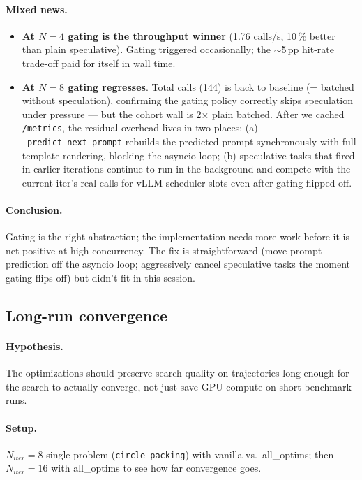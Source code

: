 \documentclass[11pt]{article}
\begin{document}
\paragraph{Mixed news.}
\begin{itemize}
  \item \textbf{At $N{=}4$ gating is the throughput winner} (1.76
    calls/s, 10\,\% better than plain speculative). Gating triggered
    occasionally; the $\sim$5\,pp hit-rate trade-off paid for itself
    in wall time.
  \item \textbf{At $N{=}8$ gating regresses}. Total calls (144) is
    back to baseline (= batched without speculation), confirming the
    gating policy correctly skips speculation under pressure --- but
    the cohort wall is 2$\times$ plain batched. After we cached
    \texttt{/metrics}, the residual overhead lives in two places:
    (a) \verb|_predict_next_prompt| rebuilds the predicted prompt
    synchronously with full template rendering, blocking the asyncio
    loop; (b) speculative tasks that fired in earlier iterations
    continue to run in the background and compete with the current
    iter's real calls for vLLM scheduler slots even after gating
    flipped off.
\end{itemize}
\paragraph{Conclusion.}
Gating is the right abstraction; the implementation needs more work
before it is net-positive at high concurrency. The fix is
straightforward (move prompt prediction off the asyncio loop;
aggressively cancel speculative tasks the moment gating flips off)
but didn't fit in this session.

\subsection{Long-run convergence}
\label{sec:results-long-run}

\paragraph{Hypothesis.}
The optimizations should preserve search quality on trajectories long
enough for the search to actually converge, not just save GPU compute
on short benchmark runs.

\paragraph{Setup.}
$N_{\textit{iter}}{=}8$ single-problem (\texttt{circle\_packing})
with vanilla vs.~all\_optims; then $N_{\textit{iter}}{=}16$ with
all\_optims to see how far convergence goes.
\end{document}
